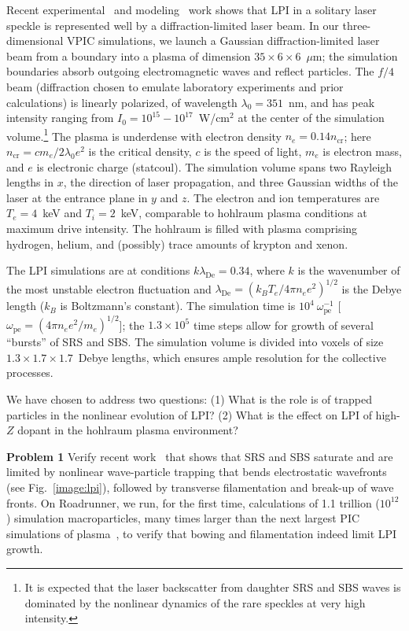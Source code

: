 \documentclass[letter,10pt]{article}
\newcommand{\lde}      {\lambda_{\mathrm{De}}}
\newcommand{\wpe}      {\omega_{\mathrm{pe}}}
\begin{document}
Recent experimental~\cite{Kline_PRL_2005} and
modeling~\cite{Yin_et_al_PRL_2007_SRS} work shows that LPI in a
solitary laser speckle is represented well by a diffraction-limited
laser beam.  In our three-dimensional VPIC simulations, we launch a
Gaussian diffraction-limited laser beam from a boundary into a plasma
of dimension $35 \times 6 \times 6$~$\mu$m; the simulation boundaries
absorb outgoing electromagnetic waves and reflect particles.  The
$f/4$ beam (diffraction chosen to emulate laboratory experiments and
prior calculations) is linearly polarized, of wavelength
$\lambda_0 = 351$~nm, and has peak intensity ranging from $I_0 =
10^{15} - 10^{17}$~W/cm$^2$ at the center of the simulation volume.\footnote{It 
is expected that the laser backscatter from daughter SRS and SBS waves 
is dominated by the nonlinear dynamics of the rare speckles at very 
high intensity.}
The plasma is underdense with electron density $n_e = 0.14
n_{\mathrm{cr}}$; here $n_{\mathrm{cr}} = c m_e / 2 \lambda_0 e^2$ is
the critical density, $c$ is the speed of light, $m_e$ is electron
mass, and $e$ is electronic charge (statcoul).  The simulation volume 
spans two Rayleigh lengths in $x$, the direction
of laser propagation, and three Gaussian widths of the laser
at the entrance plane in $y$ and $z$.  The electron and ion
temperatures are $T_e = 4$~keV and $T_i = 2$~keV, comparable to hohlraum
plasma conditions at maximum drive intensity.  The
hohlraum is filled with plasma comprising hydrogen, helium, and
(possibly) trace amounts of krypton and xenon.

The LPI simulations are at conditions $k \lde = 0.34$, where $k$
is the wavenumber of the most unstable electron 
fluctuation and $\lde = (k_B T_e / 4 \pi n_e e^2)^{1/2}$ is the 
Debye length ($k_B$ is Boltzmann's constant).  The simulation time is
$10^4~\wpe^{-1}$ [$\wpe = (4 \pi n_e e^2 / m_e)^{1/2}$]; 
the $1.3 \times 10^5$ time steps allow for growth
of several ``bursts'' of SRS and SBS.  The simulation volume is
divided into voxels of size $1.3 \times 1.7 \times 1.7$~Debye
lengths, which ensures ample resolution for the collective
processes.

We have chosen to address two questions: (1) What is
the role is of trapped particles in the nonlinear evolution of LPI?
(2) What is the effect on LPI of high-$Z$ dopant in the
hohlraum plasma environment?

\textbf{Problem 1}
Verify recent work~\cite{Yin_et_al_PRL_2007_SRS,Yin_et_al_Phys_Plasmas_2007_SRS}
that shows that SRS and SBS saturate and are limited by nonlinear 
wave-particle trapping that bends electrostatic wavefronts (see 
Fig.~\ref{image:lpi}), followed by transverse filamentation and break-up 
of wave fronts.  On Roadrunner, we run, for the first 
time, calculations of 1.1 trillion ($10^{12}$) simulation macroparticles,
many times larger than the next largest PIC simulations of
plasma~\cite{Yin_et_al_PRL_2007_reconnection}, to verify that 
bowing and filamentation indeed limit LPI growth.
\end{document}
